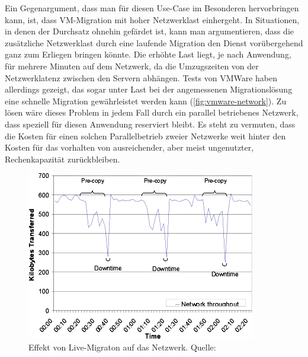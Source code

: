 Ein Gegenargument, dass man für diesen Use-Case im Besonderen
hervorbringen kann, ist, dass VM-Migration mit hoher Netzwerklast
einhergeht. In Situationen, in denen der Durchsatz ohnehin gefärdet
ist, kann man argumentieren, dass die zusätzliche Netzwerklast durch
eine laufende Migration den Dienst vorübergehend ganz zum Erliegen
bringen könnte. Die erhöhte Last liegt, je nach Anwendung, für mehrere
Minuten auf dem Netzwerk, da die Umzugszeiten von der Netzwerklatenz
zwischen den Servern abhängen. Tests von VMWare haben allerdings
gezeigt, das sogar unter Last bei der angemessenen Migrationslösung
eine schnelle Migration gewährleistet werden kann
(\autoref{fig:vmware-network}). Zu lösen wäre dieses Problem in jedem
Fall durch ein parallel betriebenes Netzwerk, dass speziell für diesen
Anwendung reserviert bleibt. Es steht zu vermuten, dass die Kosten für
einen solchen Parallelbetrieb zweier Netzwerke weit hinter den Kosten
für das vorhalten von ausreichender, aber meist ungenutzter,
Rechenkapazität zurückbleiben.
\begin{figure}[b]
  \centering
  \includegraphics[width=0.9\linewidth]{images/vmware-network}
  \caption{Effekt von Live-Migraton auf das
    Netzwerk. Quelle:~\cite{nelson2005fast}}
  \label{fig:vmware-network}
\end{figure}

